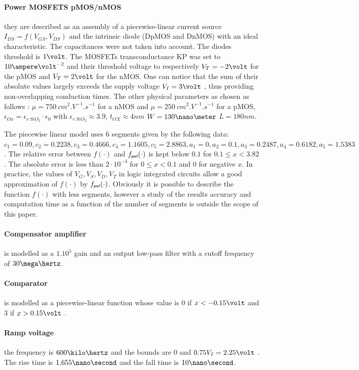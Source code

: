 \paragraph{Power MOSFETS pMOS/nMOS} they are described as an assembly of a
piecewise-linear current source $I_{DS} = f(V_{GS}, V_{DS})$ and the intrinsic diode
(DpMOS and DnMOS) with an ideal characteristic.
The capacitances were not taken into account. The diodes threshold is
$1\volt$. 
The MOSFETs transconductance KP was set to $10 \ampere\volt^{-2}$ and
their threshold voltage to respectively $V_T = -2 \volt$ for the pMOS and $V_T= 2 \volt$ for
the nMOS. One can notice that the sum of their absolute values largely
exceeds the supply voltage $V_{I} = 3 \volt$ , thus providing non-overlapping
conduction times. The other physical parameters as chosen as follows : $\mu = 750~cm^2.V^{-1}.s^{-1}$ for a nMOS and $\mu=250~cm^2.V^{-1}.s^{-1}$ for a pMOS, $\epsilon_{Ox} = \epsilon_{r~SiO_2} \cdot \epsilon_0$ with $\epsilon_{r~SiO_2} \approx 3.9$, $t_{OX} \approx 4 nm$ $W = 130\nano \meter$ $L=180 nm$. 

The piecewise linear model uses $6$ segments given by the following data:$ c_1 = 0.09 , c_2=0.2238 , c_3=0.4666 , c_4=1.1605 , c_5=2.8863,  a_1 = 0 , a_2=0.1, a_3=0.2487 , a_4=0.6182 , a_5=1.5383$. The relative error between $f(\cdot)$ and $f_\pwl(\cdot)$ is kept below $0.1$ for $0.1 \leq x < 3.82$. The absolute error is less than $2 \cdot 10^{-3}$ for $0 \leq x < 0.1$ and $0$ for negative $x$. In practice, the values of $V_G,V_S,V_D,V_T$ in logic integrated circuits allow  a good approximation of $f(\cdot)$ by $f_\pwl(\cdot)$. Obviously it is possible to describe the function $f(\cdot)$ with less segments, however a study of the results accuracy and computation time as a function of the number of segments is outside the scope of this paper. 


\paragraph{Compensator amplifier} is modelled as a $1.10^5$ gain and an output low-pass
filter with a cutoff frequency of $30 \mega\hertz$.
\paragraph{Comparator} is modelled as a piecewise-linear function whose value is $0$ if
$x < -0.15\volt$ and 3 if $x > 0.15\volt$ .
\paragraph{Ramp voltage} the frequency is $600 \kilo\hertz$ and the bounds are $0$ and $0.75 V_I = 2.25 \volt$ .
The rise time is $1.655 \nano\second$ and the fall time is $10 \nano\second$.
